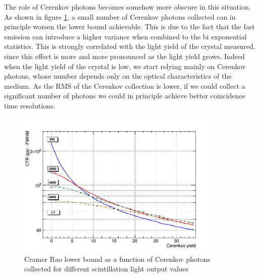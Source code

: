 The role of Cerenkov photons becomes somehow more obscure in this situation. As shown in figure \ref{fig:cramer_cer}, a small number of Cerenkov photons collected can in principle worsen the lower bound achievable. This is due to the fact that the fast emission can introduce a higher variance when combined to the bi exponential statistics. This is strongly correlated with the light yield of the crystal measured, since this effect is more and more pronounced as the light yield grows. Indeed when the light yield of the crystal is low, we start relying mainly on Cerenkov photons, whose number depends only on the optical characteristics of the medium. As the RMS of the Cerenkov collection is lower, if we could collect a significant number of photons we could in principle achieve better coincidence time resolutions.
\begin{figure}[htbp]
\begin{center}
\includegraphics[width=10cm]{../Pictures/Chapter_4/CY_LY_cramer_rao.png}
\end{center}
\caption[Cramer Rao evolution - Cerenkov]{Cramer Rao lower bound as a function of Cerenkov photons collected for different scintillation light output values}
\label{fig:cramer_cer}
\end{figure}

